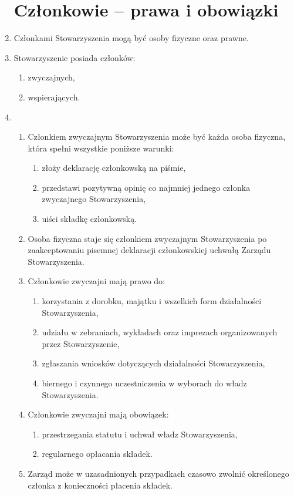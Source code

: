 \documentclass[chapterprefix,notitlepage]{article}
\begin{document}
\begin{enumerate}
	
\section{Członkowie -- prawa i obowiązki}	
	
	\item Członkami Stowarzyszenia mogą być osoby fizyczne oraz prawne.
	
	\item Stowarzyszenie posiada członków:
	\begin{enumerate}[1)]
		\item zwyczajnych,
		\item wspierających.
	\end{enumerate}

	\item \begin{enumerate}
		\item Członkiem zwyczajnym Stowarzyszenia może być każda osoba fizyczna, która spełni wszystkie poniższe warunki:
		\begin{enumerate}
			\item złoży deklarację członkowską na piśmie,
			\item przedstawi pozytywną opinię co najmniej jednego członka zwyczajnego Stowarzyszenia,
			\item uiści składkę członkowską.
		\end{enumerate}
		\item Osoba fizyczna staje się członkiem zwyczajnym Stowarzyszenia po zaakceptowaniu pisemnej deklaracji członkowskiej uchwałą Zarządu Stowarzyszenia.
		\item Członkowie zwyczajni mają prawo do:
		\begin{enumerate}
			\item korzystania z dorobku, majątku i wszelkich form działalności Stowarzyszenia,
			\item udziału w zebraniach, wykładach oraz imprezach organizowanych przez Stowarzyszenie,
			\item zgłaszania wniosków dotyczących działalności Stowarzyszenia,
			\item biernego i czynnego uczestniczenia w wyborach do władz Stowarzyszenia.
		\end{enumerate}
		\item Członkowie zwyczajni mają obowiązek:
		\begin{enumerate}
			\item przestrzegania statutu i uchwał władz Stowarzyszenia,
			\item regularnego opłacania składek.
		\end{enumerate}
		\item Zarząd może w uzasadnionych przypadkach czasowo zwolnić określonego członka z konieczności płacenia składek.
	\end{enumerate}


\end{enumerate}
\end{document}

